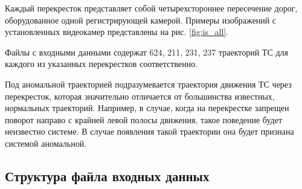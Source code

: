 Каждый перекресток представляет собой четырехстороннее пересечение дорог, оборудованное одной регистрирующей камерой. Примеры изображений с установленных видеокамер представлены на рис. \ref{fig:is_all}.


Файлы с входными данными содержат 624, 211, 231, 237 траекторий ТС для каждого из указанных перекрестков соответственно.

Под аномальной траекторией подразумевается траектория движения ТС через перекресток, которая значительно отличается от большинства известных, нормальных траекторий. Например, в случае, когда на перекрестке запрещен поворот направо с крайней левой полосы движения, такое поведение будет неизвестно системе. В случае появления такой траектории она будет признана системой аномальной.


\subsection{Структура файла входных данных}

